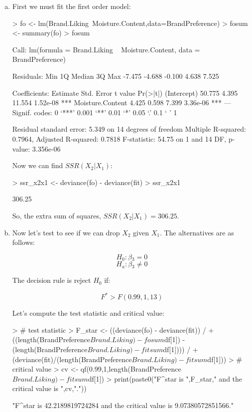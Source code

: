 \documentclass{article}
\begin{document}
\begin{enumerate}[a)]
\item{} First we must fit the first order model:

\begin{Schunk}
\begin{Sinput}
> fo <- lm(Brand.Liking~Moisture.Content,data=BrandPreference)
> fosum <- summary(fo)
> fosum
\end{Sinput}
\begin{Soutput}
Call:
lm(formula = Brand.Liking ~ Moisture.Content, data = BrandPreference)

Residuals:
   Min     1Q Median     3Q    Max 
-7.475 -4.688 -0.100  4.638  7.525 

Coefficients:
                 Estimate Std. Error t value Pr(>|t|)    
(Intercept)        50.775      4.395  11.554 1.52e-08 ***
Moisture.Content    4.425      0.598   7.399 3.36e-06 ***
---
Signif. codes:  0 ‘***’ 0.001 ‘**’ 0.01 ‘*’ 0.05 ‘.’ 0.1 ‘ ’ 1

Residual standard error: 5.349 on 14 degrees of freedom
Multiple R-squared:  0.7964,	Adjusted R-squared:  0.7818 
F-statistic: 54.75 on 1 and 14 DF,  p-value: 3.356e-06
\end{Soutput}
\end{Schunk}

Now we can find $SSR(X_2|X_1)$:

\begin{Schunk}
\begin{Sinput}
> ssr_x2x1 <- deviance(fo) - deviance(fit)
> ssr_x2x1
\end{Sinput}
\begin{Soutput}
[1] 306.25
\end{Soutput}
\end{Schunk}

So, the extra sum of squares, $SSR(X_2|X_1) = 306.25$.

\item{} Now let's test to see if we can drop $X_2$ given $X_1$. The alternatives are as follows:

$$ H_0: \beta{}_3 = 0 $$
$$ H_a: \beta{}_3 \neq{} 0 $$

The decision rule is reject $H_0$ if:

$$ F^* > F(0.99,1,13) $$

Let's compute the test statistic and critical value:

\begin{Schunk}
\begin{Sinput}
> # test statistic
> F_star <- ((deviance(fo) - deviance(fit)) /
+   ((length(BrandPreference$Brand.Liking) - fosum$df[1]) - (length(BrandPreference$Brand.Liking) - fitsum$df[1]))) /
+   (deviance(fit)/(length(BrandPreference$Brand.Liking) - fitsum$df[1]))
> # critical value
> cv <- qf(0.99,1,length(BrandPreference$Brand.Liking)-fitsum$df[1])
> print(paste0("F^star is ",F_star," and the critical value is ",cv,"."))
\end{Sinput}
\begin{Soutput}
[1] "F^star is 42.2189819724284 and the critical value is 9.07380572851566."
\end{Soutput}
\end{Schunk}


\end{enumerate}
\end{document}
